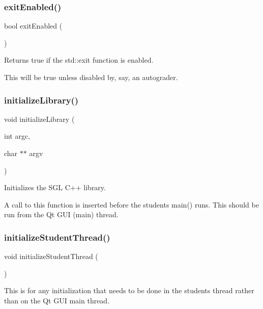 \subsubsection{\texorpdfstring{exit\+Enabled()}{exitEnabled()}}
{\footnotesize\ttfamily bool exit\+Enabled (\begin{DoxyParamCaption}{ }\end{DoxyParamCaption})}



Returns true if the std\+::exit function is enabled. 

This will be true unless disabled by, say, an autograder. \mbox{\label{namespacesgl_ab36f2e19ed11765f2b025cc8e4636010}} 
\subsubsection{\texorpdfstring{initialize\+Library()}{initializeLibrary()}}
{\footnotesize\ttfamily void initialize\+Library (\begin{DoxyParamCaption}\item[{int}]{argc,  }\item[{char $\ast$$\ast$}]{argv }\end{DoxyParamCaption})}



Initializes the S\+GL C++ library. 

A call to this function is inserted before the student\textquotesingle{}s main() runs. This should be run from the Qt G\+UI (main) thread. \mbox{\label{namespacesgl_aa826ed0038c35ea532e22c6c0a4e6036}} 
\subsubsection{\texorpdfstring{initialize\+Student\+Thread()}{initializeStudentThread()}}
{\footnotesize\ttfamily void initialize\+Student\+Thread (\begin{DoxyParamCaption}{ }\end{DoxyParamCaption})}



This is for any initialization that needs to be done in the student\textquotesingle{}s thread rather than on the Qt G\+UI main thread. 

